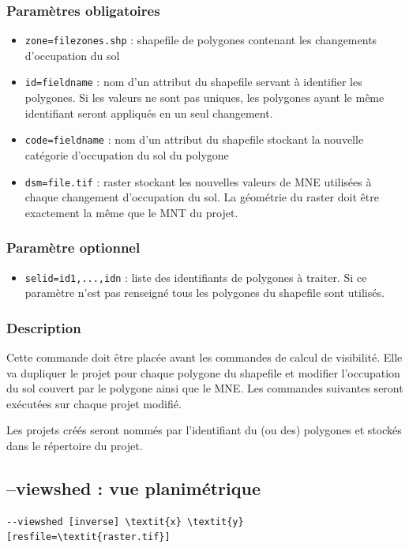 \documentclass{report}
\begin{document}
\subsubsection{Paramètres obligatoires}
\begin{itemize}
	\item \verb|zone=filezones.shp| : shapefile de polygones contenant les changements d'occupation du sol
	\item \verb|id=fieldname| : nom d'un attribut du shapefile servant à identifier les polygones. Si les valeurs ne sont pas uniques, les polygones ayant le même identifiant seront appliqués en un seul changement.
	\item \verb|code=fieldname| : nom d'un attribut du shapefile stockant la nouvelle catégorie d'occupation du sol du polygone
	\item \verb|dsm=file.tif| : raster stockant les nouvelles valeurs de MNE utilisées à chaque changement d'occupation du sol. La géométrie du raster doit être exactement la même que le MNT du projet.
\end{itemize}

\subsubsection{Paramètre optionnel}
\begin{itemize}
	\item \verb|selid=id1,...,idn| : liste des identifiants de polygones à traiter. Si ce paramètre n'est pas renseigné tous les polygones du shapefile sont utilisés.
\end{itemize}

\subsubsection{Description}
Cette commande doit être placée avant les commandes de calcul de visibilité. Elle va dupliquer le projet pour chaque polygone du shapefile et modifier l'occupation du sol couvert par le polygone ainsi que le MNE. Les commandes suivantes seront exécutées sur chaque projet modifié.

Les projets créés seront nommés par l'identifiant du (ou des) polygones et stockés dans le répertoire du projet.

\subsection{--viewshed : vue planimétrique}
\begin{Verbatim}[commandchars=\\\{\}]
--viewshed [inverse] \textit{x} \textit{y} [resfile=\textit{raster.tif}]
\end{Verbatim}
\end{document}
